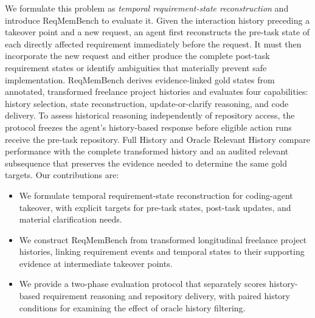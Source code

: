 \documentclass{article} %
\newcommand{\placeholder}[1]{\emph{[#1]}}
\begin{document}
We formulate this problem as \emph{temporal requirement-state reconstruction} and introduce ReqMemBench to evaluate it. Given the interaction history preceding a takeover point and a new request, an agent first reconstructs the pre-task state of each directly affected requirement immediately before the request. It must then incorporate the new request and either produce the complete post-task requirement states or identify ambiguities that materially prevent safe implementation. ReqMemBench derives evidence-linked gold states from annotated, transformed freelance project histories and evaluates four capabilities: history selection, state reconstruction, update-or-clarify reasoning, and code delivery. To assess historical reasoning independently of repository access, the protocol freezes the agent's history-based response before eligible action runs receive the pre-task repository. Full History and Oracle Relevant History compare performance with the complete transformed history and an audited relevant subsequence that preserves the evidence needed to determine the same gold targets. Our contributions are:
\begin{itemize}
    \item We formulate temporal requirement-state reconstruction for coding-agent takeover, with explicit targets for pre-task states, post-task updates, and material clarification needs.
    \item We construct ReqMemBench from transformed longitudinal freelance project histories, linking requirement events and temporal states to their supporting evidence at intermediate takeover points.
    \item We provide a two-phase evaluation protocol that separately scores history-based requirement reasoning and repository delivery, with paired history conditions for examining the effect of oracle history filtering.
\end{itemize}
\end{document}
